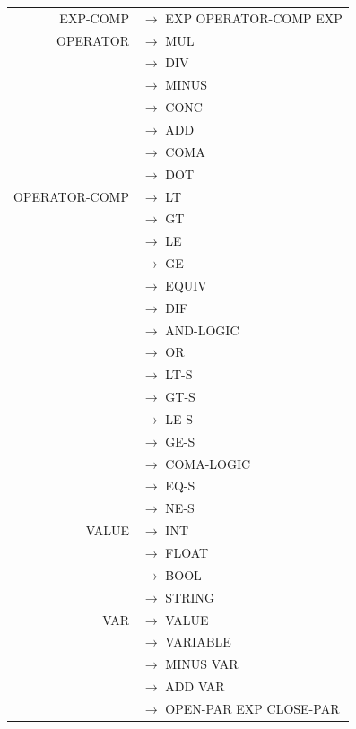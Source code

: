 \documentclass[a4paper,10pt]{article}
\begin{document}
\begin{tabular}{rl}
EXP-COMP			& $\rightarrow$ EXP OPERATOR-COMP EXP \\

OPERATOR			& $\rightarrow$ MUL \\ 
					& $\rightarrow$ DIV \\ 
					& $\rightarrow$ MINUS \\ 
					& $\rightarrow$ CONC \\ 
					& $\rightarrow$ ADD	\\ 
					& $\rightarrow$ COMA\\ 
					& $\rightarrow$ DOT	\\ 
OPERATOR-COMP		& $\rightarrow$ LT\\
					& $\rightarrow$ GT	\\
					& $\rightarrow$ LE	\\
					& $\rightarrow$ GE	\\
					& $\rightarrow$ EQUIV	\\
					& $\rightarrow$ DIF	\\
					& $\rightarrow$ AND-LOGIC	\\
					& $\rightarrow$ OR		\\
					& $\rightarrow$ LT-S\\
					& $\rightarrow$ GT-S\\
					& $\rightarrow$ LE-S	\\
					& $\rightarrow$ GE-S	\\
					& $\rightarrow$ COMA-LOGIC	\\
					& $\rightarrow$ EQ-S	\\
					& $\rightarrow$ NE-S	\\

VALUE				& $\rightarrow$ INT \\
					& $\rightarrow$ FLOAT \\
					& $\rightarrow$ BOOL \\
					& $\rightarrow$ STRING \\
					
VAR					& $\rightarrow$ VALUE \\
					& $\rightarrow$ VARIABLE \\
					& $\rightarrow$ MINUS VAR\\
					& $\rightarrow$ ADD VAR \\
					& $\rightarrow$ OPEN-PAR EXP CLOSE-PAR \\

\end{tabular}

~\\
\end{document}

